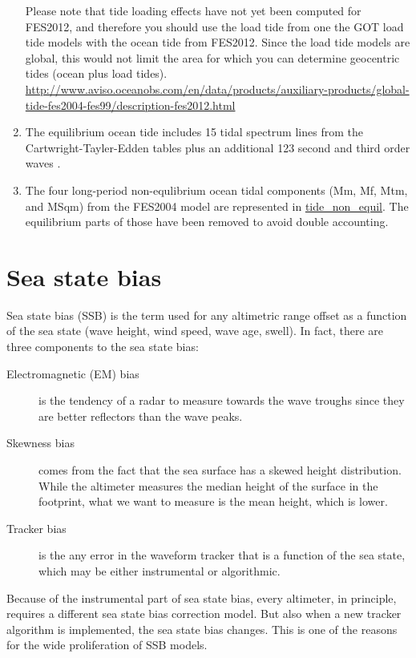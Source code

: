 \documentclass[a4paper,11pt,openany,natbib]{thesis}
\makeatletter
\newcommand\var[1]{\url{#1}\index{variables!#1@\protect\url{#1}}}
\makeatother
\begin{document}
\begin{enumerate}
Please note that tide loading effects have not yet been computed for FES2012, and therefore you should use the load tide from one the GOT load tide models with the ocean tide from FES2012. Since the load tide models are global, this would not limit the area for which you can determine geocentric tides (ocean plus load tides). \url{http://www.aviso.oceanobs.com/en/data/products/auxiliary-products/global-tide-fes2004-fes99/description-fes2012.html}\label{item:tide_ocean_fes12}
\item The equilibrium ocean tide includes 15 tidal spectrum lines from the Cartwright-Tayler-Edden tables \citep{cartwright1971,cartwright1973} plus an additional 123 second and third order waves \citep{tamura1987}.\label{item:tide_equil}
\item The four long-period non-equlibrium ocean tidal components (Mm, Mf, Mtm, and MSqm) from the FES2004 model are represented in \var{tide_non_equil}. The equilibrium parts of those have been removed to avoid double accounting.\label{item:tide_non_equil}
\end{enumerate}

\section{Sea state bias}
\label{var:ssb}
Sea state bias (SSB) is the term used for any altimetric range offset as a function of the sea state (wave height, wind speed, wave age, swell). In fact, there are three components to the sea state bias:
\begin{description}
\item[Electromagnetic (EM) bias] is the tendency of a radar to measure towards the wave troughs since they are better reflectors than the wave peaks.
\item[Skewness bias] comes from the fact that the sea surface has a skewed height distribution. While the altimeter measures the median height of the surface in the footprint, what we want to measure is the mean height, which is lower.
\item[Tracker bias] is the any error in the waveform tracker that is a function of the sea state, which may be either instrumental or algorithmic.
\end{description}

Because of the instrumental part of sea state bias, every altimeter, in principle, requires a different sea state bias correction model. But also when a new tracker algorithm is implemented, the sea state bias changes. This is one of the reasons for the wide proliferation of SSB models.
\end{document}
